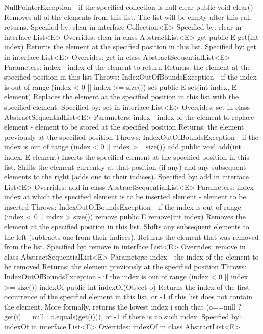 \documentclass[babel]{book}
\begin{document}
NullPointerException - if the specified collection is null
clear
public void clear()
Removes all of the elements from this list. The list will be empty after this call returns.
Specified by:
clear in interface Collection<E>
Specified by:
clear in interface List<E>
Overrides:
clear in class AbstractList<E>
get
public E get(int index)
Returns the element at the specified position in this list.
Specified by:
get in interface List<E>
Overrides:
get in class AbstractSequentialList<E>
Parameters:
index - index of the element to return
Returns:
the element at the specified position in this list
Throws:
IndexOutOfBoundsException - if the index is out of range (index < 0 || index >= size())
set
public E set(int index,
E element)
Replaces the element at the specified position in this list with the specified element.
Specified by:
set in interface List<E>
Overrides:
set in class AbstractSequentialList<E>
Parameters:
index - index of the element to replace
element - element to be stored at the specified position
Returns:
the element previously at the specified position
Throws:
IndexOutOfBoundsException - if the index is out of range (index < 0 || index >= size())
add
public void add(int index,
E element)
Inserts the specified element at the specified position in this list. Shifts the element currently at that position (if any) and any subsequent elements to the right (adds one to their indices).
Specified by:
add in interface List<E>
Overrides:
add in class AbstractSequentialList<E>
Parameters:
index - index at which the specified element is to be inserted
element - element to be inserted
Throws:
IndexOutOfBoundsException - if the index is out of range (index < 0 || index > size())
remove
public E remove(int index)
Removes the element at the specified position in this list. Shifts any subsequent elements to the left (subtracts one from their indices). Returns the element that was removed from the list.
Specified by:
remove in interface List<E>
Overrides:
remove in class AbstractSequentialList<E>
Parameters:
index - the index of the element to be removed
Returns:
the element previously at the specified position
Throws:
IndexOutOfBoundsException - if the index is out of range (index < 0 || index >= size())
indexOf
public int indexOf(Object o)
Returns the index of the first occurrence of the specified element in this list, or -1 if this list does not contain the element. More formally, returns the lowest index i such that (o==null ? get(i)==null : o.equals(get(i))), or -1 if there is no such index.
Specified by:
indexOf in interface List<E>
Overrides:
indexOf in class AbstractList<E>
\end{document}
